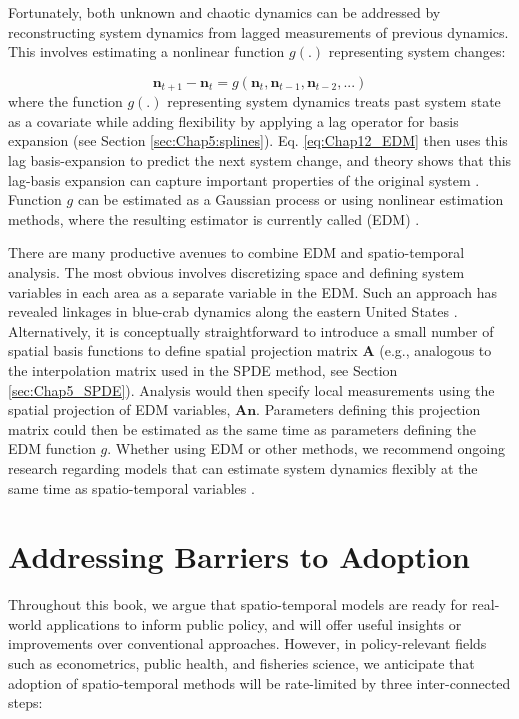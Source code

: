 Fortunately, both unknown and chaotic dynamics can be addressed by reconstructing system dynamics from lagged measurements of previous dynamics.  This involves estimating a nonlinear function \(g(.)\) representing system changes:

\begin{equation} \label{eq:Chap12_EDM}
    \mathbf{n}_{t+1} - \mathbf{n}_t = g( \mathbf{n}_t, \mathbf{n}_{t-1}, \mathbf{n}_{t-2}, ... )
\end{equation}
where the function \(g(.)\) representing system dynamics treats past system state as a covariate while adding flexibility by applying a lag operator for basis expansion (see Section \ref{sec:Chap5:splines}).  Eq. \ref{eq:Chap12_EDM} then uses this lag basis-expansion to predict the next system change, and theory shows that this lag-basis expansion can capture important properties of the original system \cite{takens_detecting_1981}.  Function \(g\) can be estimated as a Gaussian process or using nonlinear estimation methods, where the resulting estimator is currently called  (EDM) \cite{munch_recent_2023}.

There are many productive avenues to combine EDM and spatio-temporal analysis.  The most obvious involves discretizing space and defining system variables in each area as a separate variable in the EDM.  Such an approach has revealed linkages in blue-crab dynamics along the eastern United States \cite{rogers_hidden_2020}.  Alternatively, it is conceptually straightforward to introduce a small number of spatial basis functions to define spatial projection matrix \(\mathbf{A}\) (e.g., analogous to the interpolation matrix used in the SPDE method, see Section \ref{sec:Chap5_SPDE}).  Analysis would then specify local measurements using the spatial projection of EDM variables, \(\mathbf{An}\).  Parameters defining this projection matrix could then be estimated as the same time as parameters defining the EDM function \(g\). Whether using EDM or other methods, we recommend ongoing research regarding  models that can estimate system dynamics flexibly at the same time as spatio-temporal variables \cite{thorson_bayesian_2014}.    

\section{Addressing Barriers to Adoption}

Throughout this book, we argue that spatio-temporal models are ready for real-world applications to inform public policy, and will offer useful insights or improvements over conventional approaches.  However, in policy-relevant fields such as econometrics, public health, and fisheries science, we anticipate that adoption of spatio-temporal methods will be rate-limited by three inter-connected steps: 

